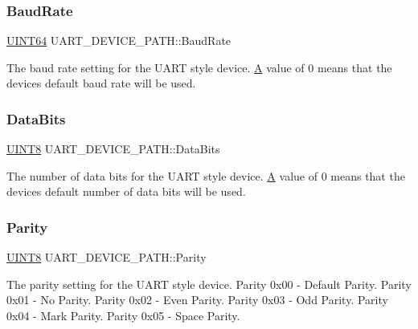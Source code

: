 \subsubsection{\texorpdfstring{Baud\+Rate}{BaudRate}}
{\footnotesize\ttfamily \hyperlink{_processor_bind_8h_a57be03562867144161c1bfee95ca8f7c}{U\+I\+N\+T64} U\+A\+R\+T\+\_\+\+D\+E\+V\+I\+C\+E\+\_\+\+P\+A\+T\+H\+::\+Baud\+Rate}

The baud rate setting for the U\+A\+RT style device. \hyperlink{struct_a}{A} value of 0 means that the device\textquotesingle{}s default baud rate will be used. \mbox{\label{struct_u_a_r_t___d_e_v_i_c_e___p_a_t_h_af8341dcf3a4ce851715773aeb46b7a5b}} 
\subsubsection{\texorpdfstring{Data\+Bits}{DataBits}}
{\footnotesize\ttfamily \hyperlink{_processor_bind_8h_ab27e9918b538ce9d8ca692479b375b6a}{U\+I\+N\+T8} U\+A\+R\+T\+\_\+\+D\+E\+V\+I\+C\+E\+\_\+\+P\+A\+T\+H\+::\+Data\+Bits}

The number of data bits for the U\+A\+RT style device. \hyperlink{struct_a}{A} value of 0 means that the device\textquotesingle{}s default number of data bits will be used. \mbox{\label{struct_u_a_r_t___d_e_v_i_c_e___p_a_t_h_a9cdb88d8b78fd7cbcfae57fbb077ed91}} 
\subsubsection{\texorpdfstring{Parity}{Parity}}
{\footnotesize\ttfamily \hyperlink{_processor_bind_8h_ab27e9918b538ce9d8ca692479b375b6a}{U\+I\+N\+T8} U\+A\+R\+T\+\_\+\+D\+E\+V\+I\+C\+E\+\_\+\+P\+A\+T\+H\+::\+Parity}

The parity setting for the U\+A\+RT style device. Parity 0x00 -\/ Default Parity. Parity 0x01 -\/ No Parity. Parity 0x02 -\/ Even Parity. Parity 0x03 -\/ Odd Parity. Parity 0x04 -\/ Mark Parity. Parity 0x05 -\/ Space Parity. \mbox{\label{struct_u_a_r_t___d_e_v_i_c_e___p_a_t_h_a66b9731e1247fe368306effc2c89eb27}} 
